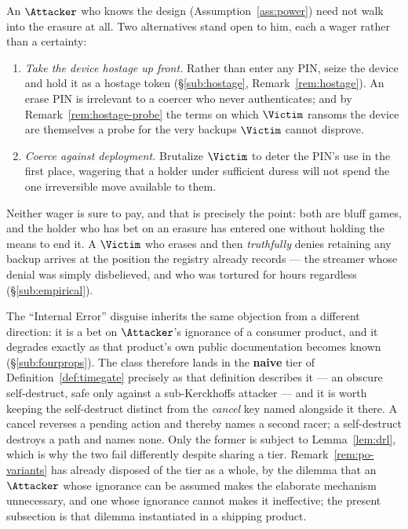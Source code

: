 \begin{remark}\label{rem:erase-bluffs}
An $\Attacker$ who knows the design (Assumption~\ref{ass:power}) need not walk
into the erasure at all. Two alternatives stand open to him, each a wager rather
than a certainty:
\begin{enumerate}[nosep,leftmargin=1.6em]
  \item \emph{Take the device hostage up front.} Rather than enter any PIN,
        seize the device and hold it as a hostage token (\S\ref{sub:hostage},
        Remark~\ref{rem:hostage}). An erase PIN is irrelevant to a coercer who
        never authenticates; and by Remark~\ref{rem:hostage-probe} the terms on
        which $\Victim$ ransoms the device are themselves a probe for the very
        backups $\Victim$ cannot disprove.
  \item \emph{Coerce against deployment.} Brutalize $\Victim$ to deter the PIN's
        use in the first place, wagering that a holder under sufficient duress
        will not spend the one irreversible move available to them.
\end{enumerate}
Neither wager is sure to pay, and that is precisely the point: both are bluff
games, and the holder who has bet on an erasure has entered one without holding
the means to end it. A $\Victim$ who erases and then \emph{truthfully} denies
retaining any backup arrives at the position the registry already records --- the
streamer whose denial was simply disbelieved, and who was tortured for hours
regardless~\cite{ratirl} (\S\ref{sub:empirical}).
\end{remark}

The ``Internal Error'' disguise inherits the same objection from a different
direction: it is a bet on $\Attacker$'s ignorance of a consumer product, and it
degrades exactly as that product's own public documentation becomes known
(\S\ref{sub:fourprops}). The class therefore lands in the \textbf{naive} tier of
Definition~\ref{def:timegate} precisely as that definition describes it --- an
obscure self-destruct, safe only against a sub-Kerckhoffs attacker --- and it is
worth keeping the self-destruct distinct from the \emph{cancel} key named
alongside it there. A cancel reverses a pending action and thereby names a second
racer; a self-destruct destroys a path and names none. Only the former is subject
to Lemma~\ref{lem:drl}, which is why the two fail differently despite sharing a
tier. Remark~\ref{rem:po-variants} has already disposed of the tier as a
whole, by the dilemma that an $\Attacker$ whose ignorance can be assumed makes
the elaborate mechanism unnecessary, and one whose ignorance cannot makes it
ineffective; the present subsection is that dilemma instantiated in a shipping
product.

